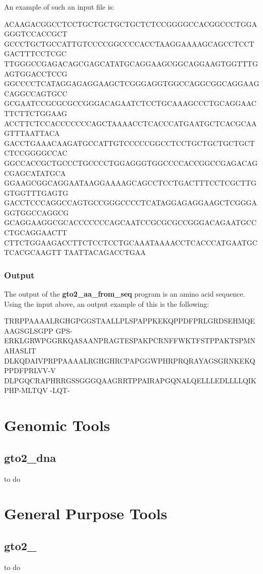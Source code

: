 \documentclass[11pt,]{krantz}
\newenvironment{Shaded}{\begin{snugshade}}{\end{snugshade}}
\newcommand{\ExtensionTok}[1]{#1}
\begin{document}
An example of such an input file is:

\begin{Shaded}
\begin{Highlighting}[]
\ExtensionTok{ACAAGACGGCCTCCTGCTGCTGCTGCTCTCCGGGGCCACGGCCCTGGAGGGTCCACCGCT}
\ExtensionTok{GCCCTGCTGCCATTGTCCCCGGCCCCACCTAAGGAAAAGCAGCCTCCTGACTTTCCTCGC}
\ExtensionTok{TTGGGCCGAGACAGCGAGCATATGCAGGAAGCGGCAGGAAGTGGTTTGAGTGGACCTCCG}
\ExtensionTok{GGCCCCTCATAGGAGAGGAAGCTCGGGAGGTGGCCAGGCGGCAGGAAGCAGGCCAGTGCC}
\ExtensionTok{GCGAATCCGCGCGCCGGGACAGAATCTCCTGCAAAGCCCTGCAGGAACTTCTTCTGGAAG}
\ExtensionTok{ACCTTCTCCACCCCCCCAGCTAAAACCTCACCCATGAATGCTCACGCAAGTTTAATTACA}
\ExtensionTok{GACCTGAAACAAGATGCCATTGTCCCCCGGCCTCCTGCTGCTGCTGCTCTCCGGGGCCAC}
\ExtensionTok{GGCCACCGCTGCCCTGCCCCTGGAGGGTGGCCCCACCGGCCGAGACAGCGAGCATATGCA}
\ExtensionTok{GGAAGCGGCAGGAATAAGGAAAAGCAGCCTCCTGACTTTCCTCGCTTGGTGGTTTGAGTG}
\ExtensionTok{GACCTCCCAGGCCAGTGCCGGGCCCCTCATAGGAGAGGAAGCTCGGGAGGTGGCCAGGCG}
\ExtensionTok{GCAGGAAGGCGCACCCCCCCAGCAATCCGCGCGCCGGGACAGAATGCCCTGCAGGAACTT}
\ExtensionTok{CTTCTGGAAGACCTTCTCCTCCTGCAAATAAAACCTCACCCATGAATGCTCACGCAAGTT}
\ExtensionTok{TAATTACAGACCTGAA}
\end{Highlighting}
\end{Shaded}

\subsection*{Output}\label{output-31}


The output of the \textbf{gto2\_aa\_from\_seq} program is an amino acid
sequence. Using the input above, an output example of this is the
following:

\begin{Shaded}
\begin{Highlighting}[]
\ExtensionTok{TRRPPAAAALRGHGPGGSTAALLPLSPAPPKEKQPPDFPRLGRDSEHMQEAAGSGLSGPP}
\ExtensionTok{GPS-ERKLGRWPGGRKQASAANPRAGTESPAKPCRNFFWKTFSTPPAKTSPMNAHASLIT}
\ExtensionTok{DLKQDAIVPRPPAAAALRGHGHRCPAPGGWPHRPRQRAYAGSGRNKEKQPPDFPRLVV-V}
\ExtensionTok{DLPGQCRAPHRRGSSGGGQAAGRRTPPAIRAPGQNALQELLLEDLLLLQIKPHP-MLTQV}
\ExtensionTok{-LQT-}
\end{Highlighting}
\end{Shaded}

\chapter{Genomic Tools}\label{genomic-tools}

\section{gto2\_dna}\label{gto2_dna}

to do

\chapter{General Purpose Tools}\label{general-purpose-tools}

\section{gto2\_}\label{gto2_}

to do



\printindex
\end{document}
